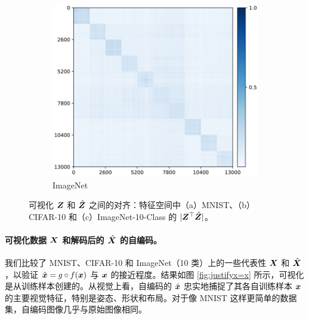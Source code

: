 \documentclass[../../book-main.tex]{subfiles}
\begin{document}
\begin{figure}[t]
\begin{subfigure}[t]{0.3\textwidth}
    \end{subfigure}
    \hfill
    \begin{subfigure}[t]{0.3\textwidth}
        \centering
        \includegraphics[width=\textwidth]{figs_chap6/Imagenet_heatmat_epoch200000.png}
        \caption{ImageNet}
    \end{subfigure}
    \caption{可视化 $\bm{Z}$ 和 $\hat{\bm{Z}}$ 之间的对齐：特征空间中（a）MNIST、（b）CIFAR-10 和（c）ImageNet-10-Class 的 $|\bm{Z}^\top \hat{\bm{Z}}|$。}
    \label{fig:justifyz=z}
\end{figure}
 





\paragraph{可视化数据 $\bm{X}$ 和解码后的 $\hat {\bm{X}}$ 的自编码。} 我们比较了 MNIST、CIFAR-10 和 ImageNet（10 类）上的一些代表性 $\bm{X}$ 和 $\hat{\bm{X}}$，以验证 $\hat {\bm{x}} = g\circ f(\bm{x})$ 与 $\bm{x}$ 的接近程度。结果如图 \ref{fig:justifyx=x} 所示，可视化是从训练样本创建的。从视觉上看，自编码的 $\hat {\bm{x}}$ 忠实地捕捉了其各自训练样本 $\bm{x}$ 的主要视觉特征，特别是姿态、形状和布局。对于像 MNIST 这样更简单的数据集，自编码图像几乎与原始图像相同。
\end{document}
